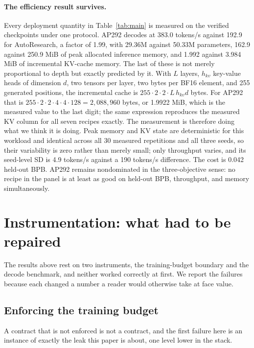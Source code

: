 \documentclass{article}
\begin{document}
\paragraph{The efficiency result survives.} Every deployment quantity in Table~\ref{tab:main} is measured on the verified checkpoints under one protocol. AP292 decodes at 383.0 tokens/s against 192.9 for AutoResearch, a factor of 1.99, with 29.36M against 50.33M parameters, 162.9 against 250.9 MiB of peak allocated inference memory, and 1.992 against 3.984 MiB of incremental KV-cache memory. The last of these is not merely proportional to depth but exactly predicted by it. With $L$ layers, $h_{kv}$ key-value heads of dimension $d$, two tensors per layer, two bytes per BF16 element, and 255 generated positions, the incremental cache is $255\cdot 2\cdot 2\cdot L\,h_{kv}d$ bytes. For AP292 that is $255\cdot2\cdot2\cdot4\cdot4\cdot128=2{,}088{,}960$ bytes, or 1.9922 MiB, which is the measured value to the last digit; the same expression reproduces the measured KV column for all seven recipes exactly. The measurement is therefore doing what we think it is doing. Peak memory and KV state are deterministic for this workload and identical across all 30 measured repetitions and all three seeds, so their variability is zero rather than merely small; only throughput varies, and its seed-level SD is 4.9 tokens/s against a 190 tokens/s difference. The cost is 0.042 held-out BPB. AP292 remains nondominated in the three-objective sense: no recipe in the panel is at least as good on held-out BPB, throughput, and memory simultaneously.

\section{Instrumentation: what had to be repaired}\label{sec:repairs}
The results above rest on two instruments, the training-budget boundary and the decode benchmark, and neither worked correctly at first. We report the failures because each changed a number a reader would otherwise take at face value.

\subsection{Enforcing the training budget}
A contract that is not enforced is not a contract, and the first failure here is an instance of exactly the leak this paper is about, one level lower in the stack.
\end{document}

